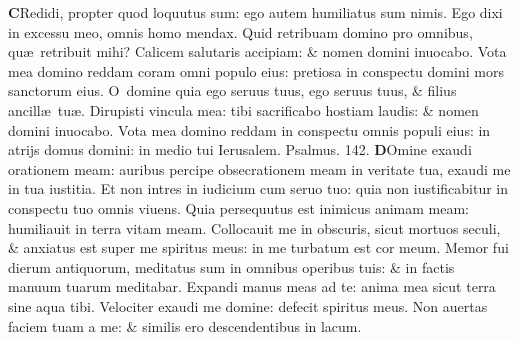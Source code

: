 \documentclass[a5paper,10pt]{book}
\def\ae{æ}
\begin{document}
\begin{multicols*}{2}
\vspace{-.5em}
\lettrine[lines=2]{\bfseries \color{red} C}{}Redidi, propter quod loquutus sum: ego autem humiliatus sum nimis.
\newline \color{red} E\color{black}go dixi in excessu meo, omnis homo mendax.
\newline \color{red} Q\color{black}uid retribuam domino pro omnibus, qu\ae \ retribuit mihi?
\newline \color{red} C\color{black}alicem salutaris accipiam: \& nomen domini inuocabo.
\newline \color{red} V\color{black}ota mea domino reddam coram omni populo eius: pretiosa in conspectu domini mors sanctorum eius.
\newline \color{red} O\color{black}\ domine quia ego seruus tuus, ego seruus tuus, \& filius ancill\ae \ tu\ae .
\newline \color{red} D\color{black}irupisti vincula mea: tibi sacrificabo hostiam laudis: \& nomen domini inuocabo.
\newline \color{red} V\color{black}ota mea domino reddam in conspectu omnis populi eius: in atrijs domus domini: in medio tui Ierusalem.
\newline \color{red} Psalmus. \hypertarget{ps142}{142.} \color{black}
\vspace{-1em}
\lettrine[lines=2]{\bfseries \color{red} D}{}Omine exaudi orationem meam: auribus percipe obsecrationem meam in veritate tua, exaudi me in tua iustitia.
\newline \color{red} E\color{black}t non intres in iudicium cum seruo tuo: quia non iustificabitur in conspectu tuo omnis viuens.
\newline \color{red} Q\color{black}uia persequutus est inimicus animam meam: humiliauit in terra vitam meam.
\newline \color{red} C\color{black}ollocauit me in obscuris, sicut mortuos seculi, \& anxiatus est super me spiritus meus: in me turbatum est cor meum.
\newline \color{red} M\color{black}emor fui dierum antiquorum, meditatus sum in omnibus operibus tuis: \& in factis manuum tuarum meditabar.
\newline \color{red} E\color{black}xpandi manus meas ad te: anima mea sicut terra sine aqua tibi.
\newline \color{red} V\color{black}elociter exaudi me domine: defecit spiritus meus.
\newline \color{red} N\color{black}on auertas faciem tuam a me: \& similis ero descendentibus in lacum.

\end{multicols*}
\end{document}
